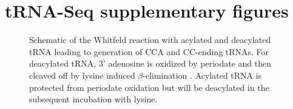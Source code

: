 \chapter{tRNA-Seq supplementary figures}


\begin{figure}[ht]
    \centering
    \caption[Whitfeld reaction scheme.]{
    Schematic of the Whitfeld reaction with acylated and deacylated tRNA leading to generation of CCA and CC-ending tRNAs.
    For deacylated tRNA, 3’ adenosine is oxidized by periodate and then cleaved off by lysine induced $\beta$-elimination \cite{Rammler1971-mt, uziel1973periodate}.
    Acylated tRNA is protected from periodate oxidation but will be deacylated in the subsequent incubation with lysine.
    }
    \label{ch5:figsupp:f1S1}
\end{figure}


